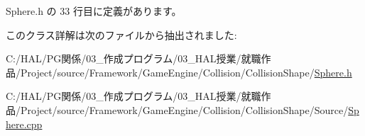  Sphere.\+h の 33 行目に定義があります。



このクラス詳解は次のファイルから抽出されました\+:\begin{DoxyCompactItemize}
\item 
C\+:/\+H\+A\+L/\+P\+G関係/03\+\_\+作成プログラム/03\+\_\+\+H\+A\+L授業/就職作品/\+Project/source/\+Framework/\+Game\+Engine/\+Collision/\+Collision\+Shape/\mbox{\hyperlink{_sphere_8h}{Sphere.\+h}}\item 
C\+:/\+H\+A\+L/\+P\+G関係/03\+\_\+作成プログラム/03\+\_\+\+H\+A\+L授業/就職作品/\+Project/source/\+Framework/\+Game\+Engine/\+Collision/\+Collision\+Shape/\+Source/\mbox{\hyperlink{_sphere_8cpp}{Sphere.\+cpp}}\end{DoxyCompactItemize}
